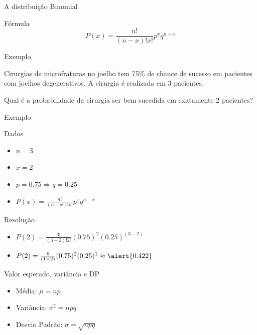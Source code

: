 \documentclass{beamer}
\begin{document}
\begin{frame}{A distribuição Binomial}
  \begin{block}{Fórmula}
    \begin{displaymath}
      P(x) = \frac{n!}{(n-x)!x!}p^x q^{n-x}
    \end{displaymath}
  \end{block}
\end{frame}

\begin{frame}{Exemplo}
  \begin{example}
    Cirurgias de microfraturas no joelho tem 75\% de chance de sucesso em pacientes com joelhos degenerativos.
    A cirurgia é realizada em 3 pacientes.

    \bigskip
    Qual é a probabilidade da cirurgia ser bem sucedida em exatamente 2 pacientes?
  \end{example}
\end{frame}

\begin{frame}{Exemplo}
  \begin{block}{Dados}
    \begin{itemize}
    \item $n = 3$
    \item $x = 2$
    \item $p = 0.75 \Rightarrow q = 0.25$
    \item $P(x) = \frac{n!}{(n-x)!x!}p^x q^{n-x}$
    \end{itemize}
  \end{block}
  \begin{block}{Resolução}
    \begin{itemize}
    \item $P(2) = \frac{3!}{(3-2)!2!}(0.75)^{2} (0.25)^{(3-2)}$
    \item $P(2) = \frac{6}{(1)(2)}(0.75)^{2} (0.25)^{1} \approx \alert{0.422}$
    \end{itemize}
  \end{block}
\end{frame}

\begin{frame}{Valor esperado, variância e DP}
  \begin{itemize}
  \item Média: $\mu = np$
  \item Variância: $\sigma^2 = npq$
  \item Desvio Padrão: $\sigma =\sqrt{npq}$
  \end{itemize}
\end{frame}
\end{document}
